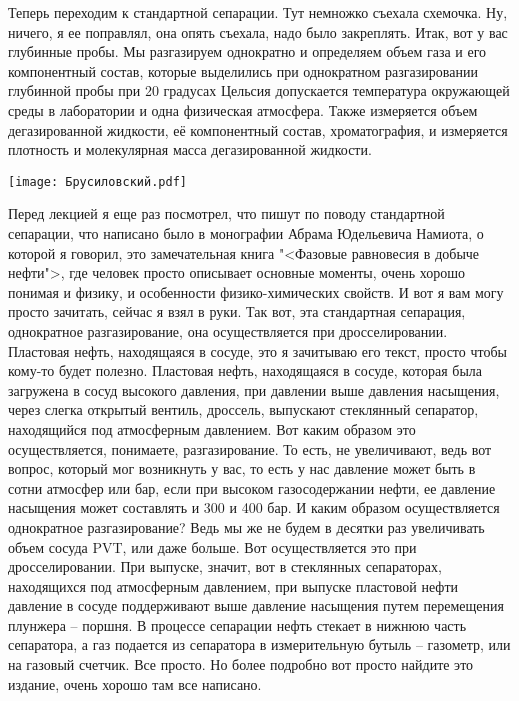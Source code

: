 \documentclass[main.tex]{subfiles}
\begin{document}
Теперь переходим к стандартной сепарации.
Тут немножко съехала схемочка.
Ну, ничего, я ее поправлял, она опять съехала, надо было закреплять.
Итак, вот у вас глубинные пробы.
Мы разгазируем однократно и определяем объем газа и его компонентный состав, которые выделились при однократном разгазировании глубинной пробы при 20 градусах Цельсия допускается температура окружающей среды в лаборатории и одна физическая атмосфера.
Также измеряется объем дегазированной жидкости, её компонентный состав, хроматография, и измеряется плотность и молекулярная масса дегазированной жидкости.

\begin{center}
\texttt{[image: Брусиловский.pdf]}
\end{center}

Перед лекцией я еще раз посмотрел, что пишут по поводу стандартной сепарации, что написано было в монографии Абрама Юдельевича Намиота, о которой я говорил, это замечательная книга "<Фазовые равновесия в добыче нефти">, где человек просто описывает основные моменты, очень хорошо понимая и физику, и особенности физико-химических свойств.
И вот я вам могу просто зачитать, сейчас я взял в руки.
Так вот, эта стандартная сепарация, однократное разгазирование, она осуществляется при дросселировании.
Пластовая нефть, находящаяся в сосуде, это я зачитываю его текст, просто чтобы кому-то будет полезно.
Пластовая нефть, находящаяся в сосуде, которая была загружена в сосуд высокого давления, при давлении выше давления насыщения, через слегка открытый вентиль, дроссель, выпускают стеклянный сепаратор, находящийся под атмосферным давлением.
Вот каким образом это осуществляется, понимаете, разгазирование.
То есть, не увеличивают, ведь вот вопрос, который мог возникнуть у вас, то есть у нас давление может быть в сотни атмосфер или бар, если при высоком газосодержании нефти, ее давление насыщения может составлять и 300 и 400 бар.
И каким образом осуществляется однократное разгазирование?
Ведь мы же не будем в десятки раз увеличивать объем сосуда PVT, или даже больше.
Вот осуществляется это при дросселировании.
При выпуске, значит, вот в стеклянных сепараторах, находящихся под атмосферным давлением, при выпуске пластовой нефти давление в сосуде поддерживают выше давление насыщения путем перемещения плунжера -- поршня.
В процессе сепарации нефть стекает в нижнюю часть сепаратора, а газ подается из сепаратора в измерительную бутыль -- газометр, или на газовый счетчик.
Все просто.
Но более подробно вот просто найдите это издание, очень хорошо там все написано.
\end{document}
